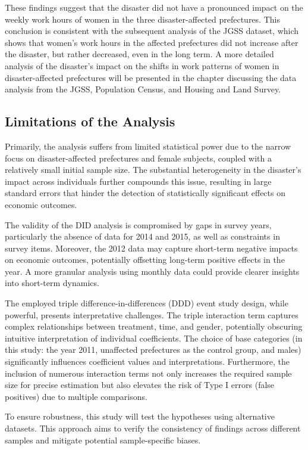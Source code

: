 \documentclass[a4paper,12pt]{article}
\begin{document}
These findings suggest that the disaster did not have a pronounced impact on the weekly work hours of women in the three disaster-affected prefectures. This conclusion is consistent with the subsequent analysis of the JGSS dataset, which shows that women's work hours in the affected prefectures did not increase after the disaster, but rather decreased, even in the long term. A more detailed analysis of the disaster's impact on the shifts in work patterns of women in disaster-affected prefectures will be presented in the chapter discussing the data analysis from the JGSS, Population Census, and Housing and Land Survey.


\subsection{Limitations of the Analysis}

Primarily, the analysis suffers from limited statistical power due to the narrow focus on disaster-affected prefectures and female subjects, coupled with a relatively small initial sample size. The substantial heterogeneity in the disaster's impact across individuals further compounds this issue, resulting in large standard errors that hinder the detection of statistically significant effects on economic outcomes.

The validity of the DID analysis is compromised by gaps in survey years, particularly the absence of data for 2014 and 2015, as well as constraints in survey items. Moreover, the 2012 data may capture short-term negative impacts on economic outcomes, potentially offsetting long-term positive effects in the year. A more granular analysis using monthly data could provide clearer insights into short-term dynamics.

The employed triple difference-in-differences (DDD) event study design, while powerful, presents interpretative challenges. The triple interaction term captures complex relationships between treatment, time, and gender, potentially obscuring intuitive interpretation of individual coefficients. The choice of base categories (in this study: the year 2011, unaffected prefectures as the control group, and males) significantly influences coefficient values and interpretations. Furthermore, the inclusion of numerous interaction terms not only increases the required sample size for precise estimation but also elevates the risk of Type I errors (false positives) due to multiple comparisons.

To ensure robustness, this study will test the hypotheses using alternative datasets. This approach aims to verify the consistency of findings across different samples and mitigate potential sample-specific biases.
\end{document}
